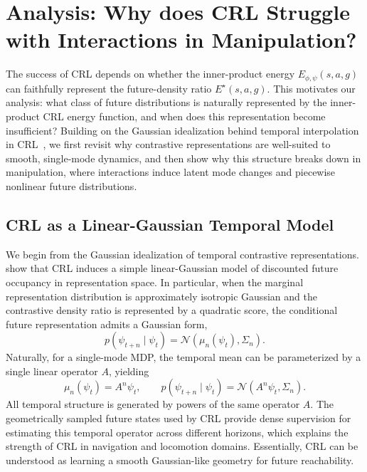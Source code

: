 \section{Analysis: Why does CRL Struggle with Interactions in Manipulation?}
\label{sec: analysis}
The success of CRL depends on whether the inner-product energy $E_{\phi,\psi}(s,a,g)$ can faithfully represent the future-density ratio $E^\star(s,a,g)$.
This motivates our analysis: what class of future distributions is naturally represented by the inner-product CRL energy function, and when does this representation become insufficient? Building on the Gaussian idealization behind temporal interpolation in CRL~\citep{eysenbach2024inference}, we first revisit why contrastive representations are well-suited to smooth, single-mode dynamics, and then show why this structure breaks down in manipulation, where interactions induce latent mode changes and piecewise nonlinear future distributions.
\subsection{CRL as a Linear-Gaussian Temporal Model}
\label{subsec:crl-gaussian-view}
We begin from the Gaussian idealization of temporal contrastive representations. \citet{eysenbach2024inference} show that CRL induces a simple linear-Gaussian model of discounted future occupancy in representation space. In particular, when the marginal representation distribution is approximately isotropic Gaussian and the contrastive density ratio is represented by a quadratic score, the conditional future representation admits a Gaussian form,
\begin{equation*}
    p(\psi_{t+n}\mid \psi_t)
    =
    \mathcal N(\mu_n(\psi_t),\Sigma_n).
\end{equation*}
Naturally, for a single-mode MDP, the temporal mean can be parameterized by a single linear operator $A$, yielding
\begin{equation}
    \mu_n(\psi_t) = A^n\psi_t,
    \qquad
    p(\psi_{t+n}\mid \psi_t)
    =
    \mathcal N(A^n\psi_t,\Sigma_n).
\end{equation}
All temporal structure is generated by powers of the same operator $A$. The geometrically sampled future states used by CRL provide dense supervision for estimating this temporal operator across different horizons, which explains the strength of CRL in navigation and locomotion domains. Essentially, CRL can be understood as learning a smooth Gaussian-like geometry for future reachability.

